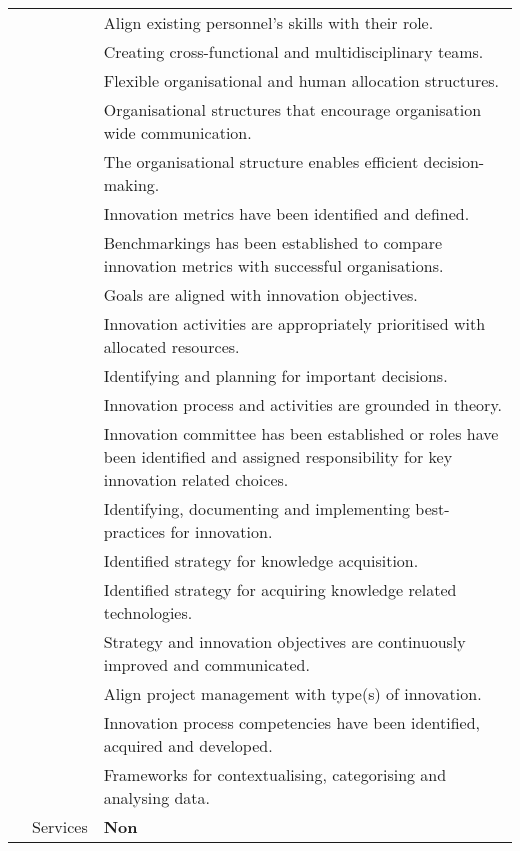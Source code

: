 {\begin{longtable}{|p{2.5cm}|p{3cm}|p{8cm}|}
        & & Align existing personnel’s skills with their role. \\ \cline{3-3}
        & & Creating cross-functional and multidisciplinary teams. \\ \cline{3-3}
        & & Flexible organisational and human allocation structures. \\ \cline{3-3}
        & & Organisational structures that encourage organisation wide communication. \\ \cline{3-3}
        & & The organisational structure enables efficient decision-making. \\ \cline{3-3}
        & & Innovation metrics have been identified and defined. \\ \cline{3-3}
        & & Benchmarkings has been established to compare innovation metrics with successful organisations. \\ \cline{3-3}
        & & Goals are aligned with innovation objectives. \\ \cline{3-3}
        & & Innovation activities are appropriately prioritised with allocated resources.\\ \cline{3-3}
        & & Identifying and planning for important decisions. \\ \cline{3-3}
        & & Innovation process and activities are grounded in theory. \\ \cline{3-3}
        & & Innovation committee has been established or roles have been identified and assigned responsibility for key innovation related choices. \\ \cline{3-3}
        & & Identifying, documenting and implementing best-practices for innovation. \\ \cline{3-3}
        & & Identified strategy for knowledge acquisition. \\  \cline{3-3}
        & & Identified strategy for acquiring knowledge related technologies. \\  \cline{3-3}
        & & Strategy and innovation objectives are continuously improved and communicated. \\ \cline{3-3}
        & & Align project management with type(s) of innovation. \\ \cline{3-3}
        & & Innovation process competencies have been identified, acquired and developed. \\ \cline{3-3}
        & & Frameworks for contextualising, categorising and analysing data. \\ \cline{2-3}
        & \multirow{1}{3cm}{Services} & \textbf{Non} \\  \cline{2-3}

\end{longtable}}
